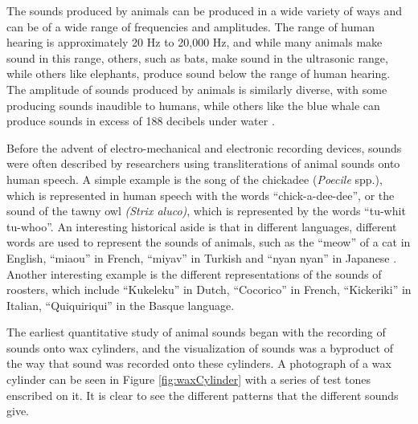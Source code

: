 The sounds produced by animals can be produced in a wide variety of
ways and can be of a wide range of frequencies and amplitudes.  The
range of human hearing is approximately 20 Hz to 20,000 Hz,
\cite{lyon1990cochlear} and while many animals make sound in this
range, others, such as bats, make sound in the ultrasonic range, while
others like elephants, produce sound below the range of human hearing.
The amplitude of sounds produced by animals is similarly diverse, with
some producing sounds inaudible to humans, while others like the blue
whale can produce sounds in excess of 188 decibels under water
\cite{clark2006acoustic}.

Before the advent of electro-mechanical and electronic recording
devices, sounds were often described by researchers using
transliterations of animal sounds onto human speech.  A simple example
is the song of the chickadee (\textit{Poecile} spp.), which is
represented in human speech with the words ``chick-a-dee-dee'', or the
sound of the tawny owl \textit{(Strix aluco)}, which is represented by
the words ``tu-whit tu-whoo''.  An interesting historical aside is
that in different languages, different words are used to represent the
sounds of animals, such as the ``meow'' of a cat in English, ``miaou''
in French, ``miyav'' in Turkish and ``nyan nyan'' in Japanese
\cite{weiss2011animals}.  Another interesting example is the different
representations of the sounds of roosters, which include ``Kukeleku''
in Dutch, ``Cocorico'' in French, ``Kickeriki'' in Italian,
``Quiquiriqui'' in the Basque language.

The earliest quantitative study of animal sounds began with the
recording of sounds onto wax cylinders, and the visualization of
sounds was a byproduct of the way that sound was recorded onto these
cylinders.  A photograph of a wax cylinder can be seen in Figure
\ref{fig:waxCylinder} with a series of test tones enscribed on it.  It
is clear to see the different patterns that the different sounds give.

